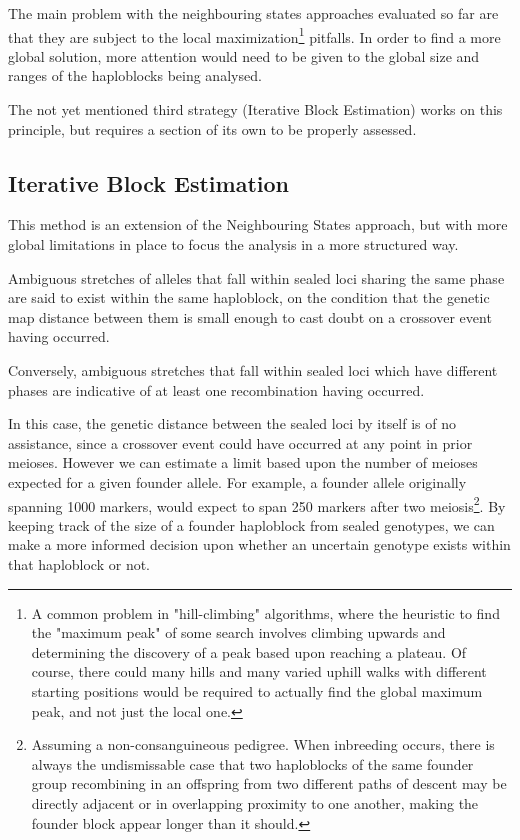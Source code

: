 The main problem with the neighbouring states approaches evaluated so far are that they are subject to the local maximization\footnote{A common problem in "hill-climbing" algorithms, where the heuristic to find the "maximum peak" of some search involves climbing upwards and determining the discovery of a peak based upon reaching a plateau. Of course, there could many hills and many varied uphill walks with different starting positions would be required to actually find the global maximum peak, and not just the local one.} pitfalls. In order to find a more global solution, more attention would need to be given to the global size and ranges of the haploblocks being analysed.

The not yet mentioned third strategy (Iterative Block Estimation) works on this principle, but requires a section of its own to be properly assessed.


\subsection{Iterative Block Estimation}

This method is an extension of the Neighbouring States approach, but with more global limitations in place to focus the analysis in a more structured way.

Ambiguous stretches of alleles that fall within sealed loci sharing the same phase are said to exist within the same haploblock, on the condition that the genetic map distance between them is small enough to cast doubt on a crossover event having occurred. 

Conversely, ambiguous stretches that fall within sealed loci which have different phases are indicative of at least one recombination having occurred. 

In this case, the genetic distance between the sealed loci by itself is of no assistance, since a crossover event could have occurred at any point in prior meioses.  However we can estimate a limit based upon the number of meioses expected for a given founder allele. For example, a founder allele originally spanning 1000 markers, would expect to span 250 markers after two meiosis\footnote{\label{footnote:consang}Assuming a non-consanguineous pedigree. When inbreeding occurs, there is always the undismissable case that two haploblocks of the same founder group recombining in an offspring from two different paths of descent may be directly adjacent or in overlapping proximity to one another, making the founder block appear longer than it should.}. By keeping track of the size of a founder haploblock from sealed genotypes, we can make a more informed decision upon whether an uncertain genotype exists within that haploblock or not.


